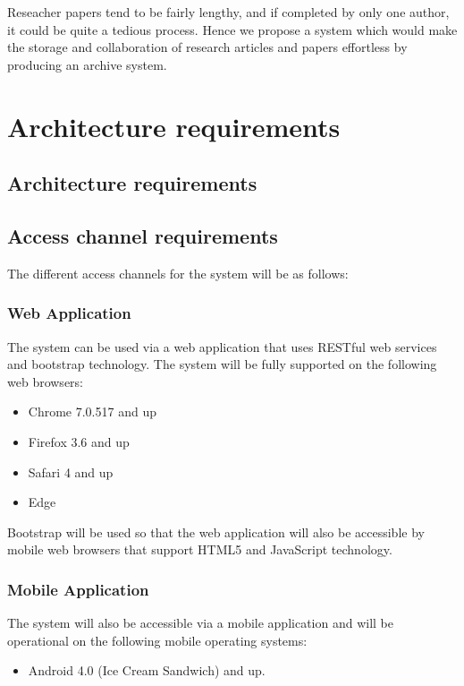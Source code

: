 \documentclass[11pt]{article}
\begin{document}
	Reseacher papers tend to be fairly lengthy, and if completed by only one author, it could be quite a tedious process. Hence we propose a system which would make the storage and collaboration of research articles and papers effortless by producing an archive system.

	\newpage
	
	\section{Architecture requirements}
	
	\subsection{Architecture requirements}
		\subsection{Access channel requirements}
			The different access channels for the system will be as follows:
		\subsubsection{Web Application}
			The system can be used via a web application that uses RESTful web services and bootstrap technology. The system will be fully supported on the following web browsers:
				\begin{itemize}
					\item Chrome 7.0.517 and up
					\item Firefox 3.6 and up
					\item Safari 4 and up
					\item Edge
				\end{itemize}
			Bootstrap will be used so that the web application will also be accessible by mobile web browsers that support HTML5 and JavaScript technology.
		\subsubsection{Mobile Application}
			The system will also be accessible via a mobile application and will be operational on the following mobile operating systems:
				\begin{itemize}
					\item Android 4.0 (Ice Cream Sandwich) and up.
				\end{itemize}
	
\end{document}
